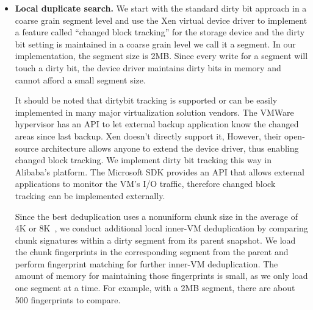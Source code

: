 


\begin{itemize}
\item \textbf{Local duplicate search.}
We start with the standard dirty bit approach in a coarse grain segment level
and use the  Xen virtual device driver to implement a feature called ``changed block tracking''
for the storage device and the dirty bit setting is maintained in a coarse grain level we call it a segment.
In our implementation, the segment size is 2MB. 
Since every write for a segment will touch a dirty bit, the device driver maintains dirty bits in memory
and cannot afford a small segment  size.

It should be noted that dirtybit tracking is supported or can be easily implemented in many 
major virtualization solution vendors. 
The VMWare hypervisor has an API to let external backup application know 
the changed areas since last backup. Xen doesn't directly support it, However, their open-source 
architecture allows anyone to extend the device driver, thus enabling changed block tracking. 
We implement dirty bit tracking this way in Alibaba's platform.  
The Microsoft SDK provides an API that allows external applications to monitor 
the VM's I/O traffic, therefore changed block tracking can be implemented externally. 

Since the best deduplication uses a nonuniform chunk size 
in the average of 4K or 8K~\cite{??},  
we conduct additional local inner-VM deduplication by comparing
chunk signatures within a dirty segment from its parent snapshot. 
We load the chunk fingerprints in the corresponding segment from the
parent and perform fingerprint matching for further inner-VM deduplication.
The amount of memory for maintaining those fingerprints  is small, as we only
load one segment at a time.
For example, with a 2MB segment, there are about 500 fingerprints to compare.



\end{itemize}
